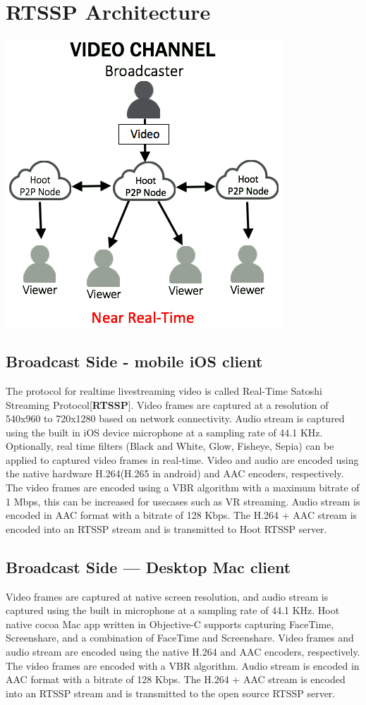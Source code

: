 \section{RTSSP Architecture}

\includegraphics[scale=0.5]{static/hoot-video-architecture-channel-trans}

\subsection{Broadcast Side - mobile iOS client}
The protocol for realtime livestreaming video is called Real-Time Satoshi Streaming Protocol[\textbf{RTSSP}].
Video frames are captured at a resolution of 540x960 to 720x1280 based on network connectivity. Audio stream is captured using the built in iOS device microphone at a sampling rate of 44.1 KHz. Optionally, real time filters (Black and White, Glow, Fisheye, Sepia) can be applied to captured video frames in real-time. Video and audio are encoded using the native hardware H.264(H.265 in android) and AAC encoders, respectively. The video frames are encoded using a VBR algorithm with a maximum bitrate of 1 Mbps, this can be increased for usecases such as VR streaming. Audio stream is encoded in AAC format with a bitrate of 128 Kbps. The H.264 + AAC stream is encoded into an RTSSP stream and is transmitted to Hoot RTSSP server.

\subsection{Broadcast Side — Desktop Mac client}
Video frames are captured at native screen resolution, and audio stream is captured using the built in microphone at a sampling rate of 44.1 KHz. Hoot native cocoa Mac app written in Objective-C supports capturing FaceTime, Screenshare, and a combination of FaceTime and Screenshare. Video frames and audio stream are encoded using the native H.264 and AAC encoders, respectively. The video frames are encoded with a VBR algorithm. Audio stream is encoded in AAC format with a bitrate of 128 Kbps. The H.264 + AAC stream is encoded into an RTSSP stream and is transmitted to the open source RTSSP server.

